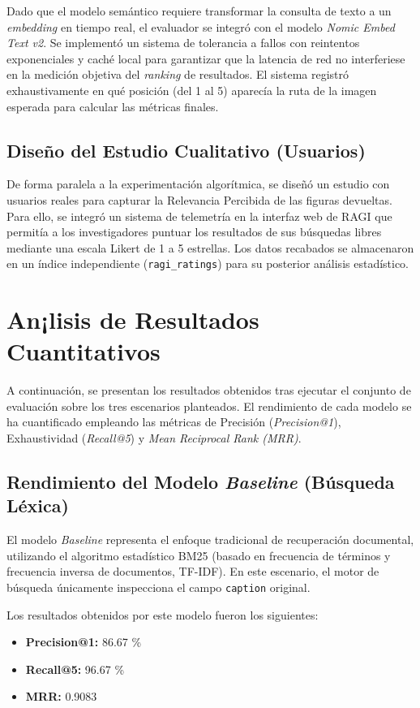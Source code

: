\documentclass[../main.tex]{subfiles}
\begin{document}
Dado que el modelo semántico requiere transformar la consulta de texto a un \textit{embedding} en tiempo real, el evaluador se integró con el modelo \textit{Nomic Embed Text v2}. Se implementó un sistema de tolerancia a fallos con reintentos exponenciales y caché local para garantizar que la latencia de red no interferiese en la medición objetiva del \textit{ranking} de resultados. El sistema registró exhaustivamente en qué posición (del 1 al 5) aparecía la ruta de la imagen esperada para calcular las métricas finales.

\subsection{Diseño del Estudio Cualitativo (Usuarios)}
De forma paralela a la experimentación algorítmica, se diseñó un estudio con usuarios reales para capturar la Relevancia Percibida de las figuras devueltas. Para ello, se integró un sistema de telemetría en la interfaz web de RAGI que permitía a los investigadores puntuar los resultados de sus búsquedas libres mediante una escala Likert de 1 a 5 estrellas. Los datos recabados se almacenaron en un índice independiente (\texttt{ragi\_ratings}) para su posterior análisis estadístico.

\section{An¡lisis de Resultados Cuantitativos}
\label{sec:resultados_numericos}

A continuación, se presentan los resultados obtenidos tras ejecutar el conjunto de evaluación sobre los tres escenarios planteados. El rendimiento de cada modelo se ha cuantificado empleando las métricas de Precisión (\textit{Precision@1}), Exhaustividad (\textit{Recall@5}) y \textit{Mean Reciprocal Rank (MRR)}.

\subsection{Rendimiento del Modelo \textit{Baseline} (Búsqueda Léxica)}
El modelo \textit{Baseline} representa el enfoque tradicional de recuperación documental, utilizando el algoritmo estadístico BM25 (basado en frecuencia de términos y frecuencia inversa de documentos, TF-IDF). En este escenario, el motor de búsqueda únicamente inspecciona el campo \texttt{caption} original.

Los resultados obtenidos por este modelo fueron los siguientes:
\begin{itemize}
    \item \textbf{Precision@1:} 86.67 \%
    \item \textbf{Recall@5:} 96.67 \%
    \item \textbf{MRR:} 0.9083
\end{itemize}
\end{document}
